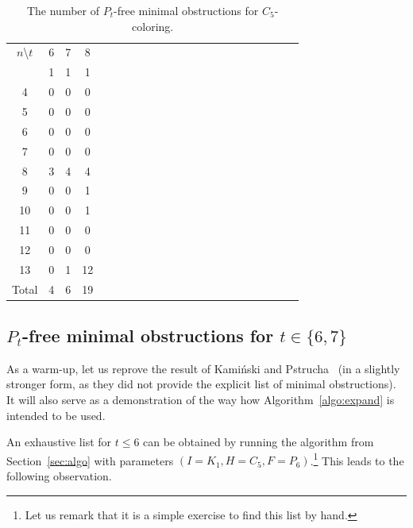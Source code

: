 \documentclass[11pt,a4paper]{article}
\theoremstyle{mystyle}
\begin{document}
\begin{table}[h!] \centering
	\begin{threeparttable}
		\begin{tabular}{cccccccccccccccccccccc} \\
			\hline
			\noalign{\smallskip}
			$n$\textbackslash$t$ & 6 & 7 & 8\\
			\noalign{\smallskip}
			\hline
			\noalign{\smallskip}
			\multicolumn{1}{c}{3} & 1 & 1 & 1\\
			\multicolumn{1}{c}{4} & 0 & 0 & 0\\
			\multicolumn{1}{c}{5} & 0 & 0 & 0\\
			\multicolumn{1}{c}{6} & 0 & 0 & 0\\
			\multicolumn{1}{c}{7} & 0 & 0 & 0\\
			\multicolumn{1}{c}{8} & 3 & 4 & 4\\
			\multicolumn{1}{c}{9} & 0 & 0 & 1\\
			\multicolumn{1}{c}{10} & 0 & 0 & 1\\
			\multicolumn{1}{c}{11} & 0 & 0 & 0\\
			\multicolumn{1}{c}{12} & 0 & 0 & 0\\
			\multicolumn{1}{c}{13} & 0 & 1 & 12\\
			\hline
			\multicolumn{1}{c}{Total} & 4 & 6 & 19\\
			\hline
		\end{tabular}
	\end{threeparttable}
	\caption{The number of $P_t$-free minimal obstructions for $C_5$-coloring.}	
		\label{tab:countsOfObstructions}
\end{table}



\subsection{$P_t$-free minimal obstructions for $t \in \{6,7\}$}
As a warm-up, let us reprove the result of Kamiński and Pstrucha~\cite{DBLP:journals/dam/KaminskiP19} (in a slightly stronger form, as they did not provide the explicit list of minimal obstructions).
It will also serve as a demonstration of the way how Algorithm~\ref{algo:expand} is intended to be used. 

An exhaustive list for $t \leq 6$ can be obtained by running the algorithm from Section~\ref{sec:algo} with parameters $(I=K_1, H=C_5, F=P_6)$.\footnote{Let us remark that it is a simple exercise to find this list by hand.} This leads to the following observation.
\end{document}
